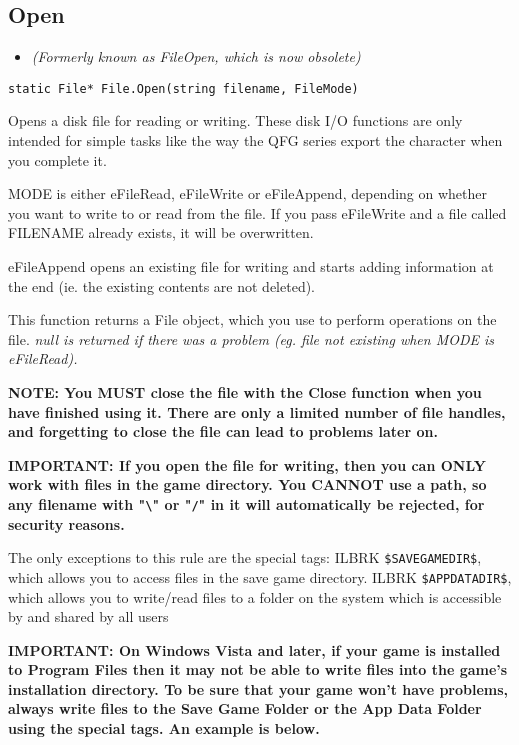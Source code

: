 \subsection{Open}\label{File.Open}%

\begin{itemize}
\item \it{(Formerly known as FileOpen, which is now obsolete)}
\end{itemize}

\begin{verbatim}
static File* File.Open(string filename, FileMode)
\end{verbatim}
Opens a disk file for reading or writing. These disk I/O functions are only
intended for simple tasks like the way the QFG series export the character
when you complete it.

MODE is either eFileRead, eFileWrite or eFileAppend, depending on
whether you want to write to or read from the file. If you pass eFileWrite
and a file called FILENAME already exists, it will be overwritten.

eFileAppend opens an existing file for writing and starts adding information at
the end (ie. the existing contents are not deleted).

This function returns a File object, which you use to perform operations on the
file. \it{null} is returned if there was a problem (eg. file not existing when MODE
is eFileRead).

\bf{NOTE:} You \bf{MUST} close the file with the Close function when you have finished
using it. There are only a limited number of file handles, and forgetting to
close the file can lead to problems later on.

\bf{IMPORTANT}: If you open the file for writing, then you can ONLY work with
files in the game directory.
You CANNOT use a path, so any filename with "\verb$\$" or "\verb$/$" in it will
automatically be rejected, for security reasons.

The only exceptions to this rule are the special tags: ILBRK
\verb^$SAVEGAMEDIR$^, which allows you to access files in the save game directory. ILBRK
\verb^$APPDATADIR$^, which allows you to write/read files to a folder on the system which
is accessible by and shared by all users

\bf{IMPORTANT}: On Windows Vista and later, if your game is installed to Program Files then
it may not be able to write files into the game's installation directory. To be sure
that your game won't have problems, \bf{always} write files to the Save Game Folder
or the App Data Folder using the special tags. An example is below.

